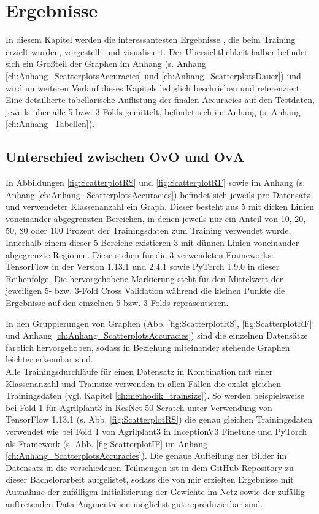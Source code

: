 \chapter{Ergebnisse}
\label{ch:ergebnisse}
In diesem Kapitel werden die interessantesten Ergebnisse \cite{githubRepo}, die beim Training erzielt wurden, vorgestellt und visualisiert. Der Übersichtlichkeit halber befindet sich ein Großteil der Graphen im Anhang (s. Anhang \ref{ch:Anhang_ScatterplotsAccuracies} und \ref{ch:Anhang_ScatterplotsDauer}) und wird im weiteren Verlauf dieses Kapitels lediglich beschrieben und referenziert.
Eine detaillierte tabellarische Auflistung der finalen Accuracies auf den Testdaten, jeweils über alle 5 bzw. 3 Folds gemittelt, befindet sich im Anhang (s. Anhang \ref{ch:Anhang_Tabellen}).

\section{Unterschied zwischen OvO und OvA}
\label{ch:ergebnisseOvOOvA}
In Abbildungen \ref{fig:ScatterplotRS} und \ref{fig:ScatterplotRF} sowie im Anhang (s. Anhang \ref{ch:Anhang_ScatterplotsAccuracies}) befindet sich jeweils pro Datensatz und verwendeter Klassenanzahl ein Graph. Dieser besteht aus 5 mit dicken Linien voneinander abgegrenzten Bereichen, in denen jeweils nur ein Anteil von 10, 20, 50, 80 oder 100 Prozent der Trainingsdaten zum Training verwendet wurde. Innerhalb einem dieser 5 Bereiche existieren 3 mit dünnen Linien voneinander abgegrenzte Regionen. Diese stehen für die 3 verwendeten Frameworks: TensorFlow \cite{tensorflow} in der Version 1.13.1 und 2.4.1 sowie PyTorch \cite{pytorch} 1.9.0 in dieser Reihenfolge. Die hervorgehobene Markierung steht für den Mittelwert der jeweiligen 5- bzw. 3-Fold Cross Validation während die kleinen Punkte die Ergebnisse auf den einzelnen 5 bzw. 3 Folds repräsentieren.

In den Gruppierungen von Graphen (Abb. \ref{fig:ScatterplotRS}, \ref{fig:ScatterplotRF} und Anhang \ref{ch:Anhang_ScatterplotsAccuracies}) sind die einzelnen Datensätze farblich hervorgehoben, sodass in Beziehung miteinander stehende Graphen leichter erkennbar sind.\\

Alle Trainingsdurchläufe für einen Datensatz in Kombination mit einer Klassenanzahl und Trainsize verwenden in allen Fällen die exakt gleichen Trainingsdaten (vgl. Kapitel \ref{ch:methodik_trainsize}). So werden beispielsweise bei Fold 1 für Agrilplant3 in ResNet-50 Scratch unter Verwendung von TensorFlow 1.13.1 \cite{tensorflow} (s. Abb. \ref{fig:ScatterplotRS}) die genau gleichen Trainingsdaten verwendet wie bei Fold 1 von Agrilplant3 in InceptionV3 Finetune und PyTorch \cite{pytorch} als Framework (s. Abb. \ref{fig:ScatterplotIF} im Anhang \ref{ch:Anhang_ScatterplotsAccuracies}). Die genaue Aufteilung der Bilder im Datensatz in die verschiedenen Teilmengen ist in dem GitHub-Repository zu dieser Bachelorarbeit \cite{githubRepo} aufgelistet, sodass die von mir erzielten Ergebnisse mit Ausnahme der zufälligen Initialisierung der Gewichte im Netz sowie der zufällig auftretenden Data-Augmentation möglichst gut reproduzierbar sind.\\

